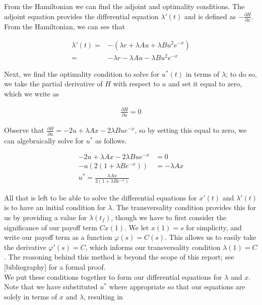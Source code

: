 \documentclass[10pt]{article}
\theoremstyle{exmp}
\begin{document}
\noindent From the Hamiltonian we can find the adjoint and optimality conditions. The adjoint equation provides the differential equation $\lambda'(t)$ and is defined as $- \frac{\partial H}{\partial x}$. From the Hamiltonian, we can see that

\begin{align}
    \lambda'(t) =& -(\lambda r + \lambda Au + \lambda Bu^2e^{-x}) \\
    =& -\lambda r - \lambda Au - \lambda Bu^2e^{-x}
\end{align}

\noindent Next, we find the optimality condition to solve for $u^*(t)$ in terms of $\lambda$; to do so, we take the partial derivative of $H$ with respect to $u$ and set it equal to zero, which we write as

\begin{align}
    \frac{\partial H}{\partial u} = 0
\end{align}
 
\noindent Observe that $\frac{\partial H}{\partial u} = -2u + \lambda Ax - 2\lambda Bue^{-x}$, so by setting this equal to zero, we can algebraically solve for $u^*$ as follows.

\begin{align*}
-2u + \lambda Ax - 2\lambda Bue^{-x} &= 0 \\ 
    -u(2(1+\lambda Be^{-x})) &= -\lambda Ax \\
u^* = \frac{\lambda Ax}{2(1+\lambda Be^{-x})}
\end{align*}

\noindent All that is left to be able to solve the differential equations for $x'(t)$ and $\lambda'(t)$ is to have an initial condition for $\lambda$. The transversality condition provides this for us by providing a value for $\lambda(t_f)$, though we have to first consider the significance of our payoff term $Cx(1)$. We let $x(1)=s$ for simplicity, and write our payoff term as a function $\varphi(s) = C(s)$. This allows us to easily take the derivative $\varphi'(s) = C$, which informs our transversality condition $\lambda(1) = C$. The reasoning behind this method is beyond the scope of this report; see [bibliography] for a formal proof. \\

\noindent We put these conditions together to form our differential equations for $\lambda$ and $x$. Note that we have substituted $u^*$ where appropriate so that our equations are solely in terms of $x$ and $\lambda$, resulting in
\end{document}
